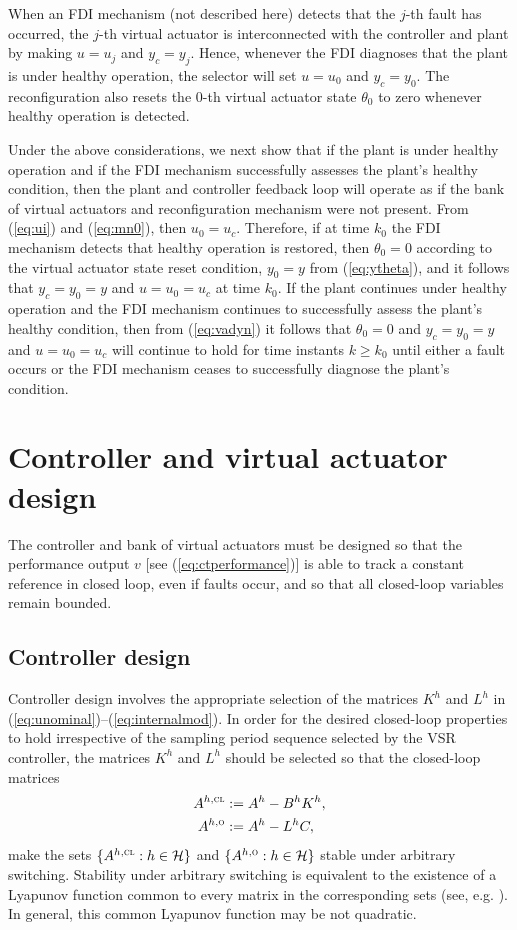 \documentclass[letterpaper, 10 pt, conference]{ieeeconf}
\newcommand{\Hset}{\mathcal{H}}
\newcommand{\dfn}{:=}
\newcommand{\cl}{\textsc{cl}}
\newcommand{\ob}{\textsc{o}}
\begin{document}
When an FDI mechanism (not described here) detects that the $j$-th
fault has occurred, the $j$-th virtual actuator is interconnected with
the controller and plant by making $u=u_j$ and $y_c=y_j$. Hence,
whenever the FDI diagnoses that the plant is under healthy operation,
the selector will set $u=u_0$ and $y_c=y_0$. The reconfiguration also
resets the 0-th virtual actuator state $\theta_0$ to zero whenever
healthy operation is detected.

Under the above considerations, we next show that if the plant is
under healthy operation and if the FDI mechanism successfully assesses
the plant's healthy condition, then the plant and controller feedback
loop will operate as if the bank of virtual actuators and
reconfiguration mechanism were not present. From (\ref{eq:ui}) and
(\ref{eq:mn0}), then $u_0 = u_c$. Therefore, if at time $k_0$ the FDI
mechanism detects that healthy operation is restored, then $\theta_0 =
0$ according to the virtual actuator state reset condition, $y_0 = y$
from (\ref{eq:ytheta}), and it follows that $y_c = y_0 = y$ and
$u=u_0=u_c$ at time $k_0$. If the plant continues under healthy
operation and the FDI mechanism continues to successfully assess the
plant's healthy condition, then from (\ref{eq:vadyn}) it follows that
$\theta_0 = 0$ and $y_c = y_0 = y$ and $u=u_0=u_c$ will continue to
hold for time instants $k\ge k_0$ until either a fault occurs or the
FDI mechanism ceases to successfully diagnose the plant's condition.


\section{Controller and virtual actuator design}
\label{sec:VA}

The controller and bank of virtual actuators must be designed so that
the performance output $v$ [see (\ref{eq:ctperformance})] is able to
track a constant reference in closed loop, even if faults occur, and
so that all closed-loop variables remain bounded.

\subsection{Controller design}
\label{sec:contr-des}


Controller design involves the appropriate selection of the matrices
$K^h$ and $L^h$ in (\ref{eq:unominal})--(\ref{eq:internalmod}). In
order for the desired closed-loop properties to hold irrespective of
the sampling period sequence selected by the VSR controller, the
matrices $K^h$ and $L^h$ should be selected so that the closed-loop
matrices
\begin{align}
  \label{eq:ahcl}
   A^{h,\cl}&\dfn A^h-B^hK^h, \\
  \label{eq:aho}
   A^{h,\ob}&\dfn A^h-L^hC,
\end{align}
make the sets $\{ A^{h,\cl} : h\in\Hset\}$ and $\{A^{h,\ob} :
h\in\Hset\}$ stable under arbitrary switching. Stability under
arbitrary switching is equivalent to the existence of a Lyapunov
function common to every matrix in the corresponding sets (see,
e.g. \cite{showir_siamrev07,lin09:_stabil}). In general, this common
Lyapunov function may be not quadratic.
\end{document}

